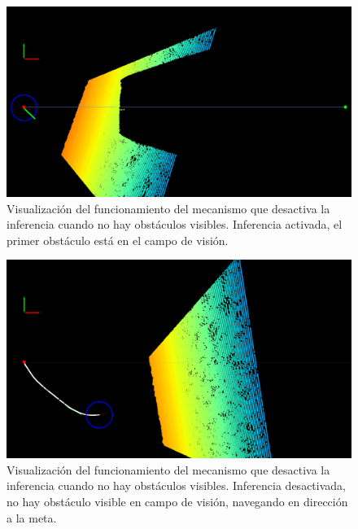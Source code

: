 \begin{figure}[H]
    \centering
    \includegraphics[scale=0.225]{partes/img/depth-dual-panel-1-first-obs.png}
    \caption[Visualización del funcionamiento del mecanismo que desactiva la inferencia cuando no hay obstáculos visibles. Inferencia activada, el primer obstáculo está en el campo de visión.]{Visualización del funcionamiento del mecanismo que desactiva la inferencia cuando no hay obstáculos visibles. Inferencia activada, el primer obstáculo está en el campo de visión.}
    \label{fig:depth-dual-panel-1}
\end{figure}

\begin{figure}[H]
    \centering
    \includegraphics[scale=0.225]{partes/img/depth-dual-panel-2-no-obs.png}
    \caption[Visualización del funcionamiento del mecanismo que desactiva la inferencia cuando no hay obstáculos visibles. Inferencia desactivada, no hay obstáculo visible en campo de visión, navegando en dirección a la meta.]{Visualización del funcionamiento del mecanismo que desactiva la inferencia cuando no hay obstáculos visibles. Inferencia desactivada, no hay obstáculo visible en campo de visión, navegando en dirección a la meta.}
    \label{fig:depth-dual-panel-2}
\end{figure}

